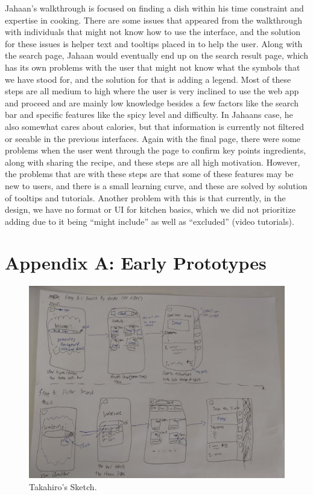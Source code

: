 \documentclass[11pt,english]{article}
\begin{document}
Jahaan’s walkthrough is focused on finding a dish within his time constraint and expertise in cooking. There are some issues that appeared from the walkthrough with individuals that might not know how to use the interface, and the solution for these issues is helper text and tooltips placed in to help the user. Along with the search page, Jahaan would eventually end up on the search result page, which has its own problems with the user that might not know what the symbols that we have stood for, and the solution for that is adding a legend. Most of these steps are all medium to high where the user is very inclined to use the web app and proceed and are mainly low knowledge besides a few factors like the search bar and specific features like the spicy level and difficulty. In Jahaans case, he also somewhat cares about calories, but that information is currently not filtered or seeable in the previous interfaces. Again with the final page, there were some problems when the user went through the page to confirm key points ingredients, along with sharing the recipe, and these steps are all high motivation. However, the problems that are with these steps are that some of these features may be new to users, and there is a small learning curve, and these are solved by solution of tooltips and tutorials. Another problem with this is that currently, in the design, we have no format or UI for kitchen basics, which we did not prioritize adding due to it being “might include” as well as “excluded” (video tutorials).
\newpage
\section{Appendix A: Early Prototypes}

\begin{figure}[H]
\centering
  \includegraphics[width=\linewidth]{figure1.jpg}
  \caption{Takahiro's Sketch.}
  \label{fig:figure1}
\end{figure}
\end{document}
